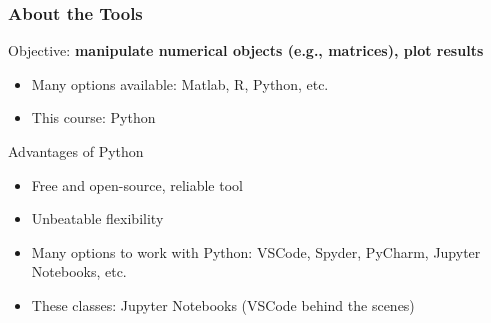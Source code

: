 \documentclass[10pt, aspectratio=1610]{beamer}
\begin{document}
  \begin{frame}
    \frametitle{About the Tools}

    Objective: \textbf{manipulate numerical objects (e.g., matrices), plot results}

    \vfill\pause

    \begin{itemize}
      \item Many options available: Matlab, R, Python, etc.
      \item This course: Python
    \end{itemize}

    \vfill\pause

    Advantages of Python
    \begin{itemize}
      \item Free and open-source, reliable tool
      \item Unbeatable flexibility
    \end{itemize}

    \vfill\pause

    \begin{itemize}
      \item Many options to work with Python: VSCode, Spyder, PyCharm, Jupyter Notebooks, etc.
      \item These classes: Jupyter Notebooks (VSCode behind the scenes)
    \end{itemize}

  \end{frame}
\end{document}
